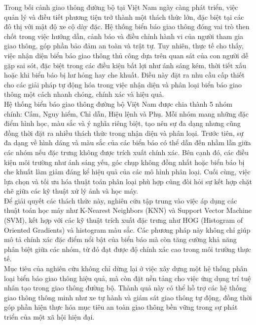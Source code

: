 \documentclass[a4paper,12pt]{article}
\begin{document}
Trong bối cảnh giao thông đường bộ tại Việt Nam ngày càng phát triển, việc quản lý và điều tiết phương tiện trở thành một thách thức lớn, đặc biệt tại các đô thị với mật độ xe cộ dày đặc. Hệ thống biển báo giao thông đóng vai trò then chốt trong việc hướng dẫn, cảnh báo và điều chỉnh hành vi của người tham gia giao thông, góp phần bảo đảm an toàn và trật tự. Tuy nhiên, thực tế cho thấy, việc nhận diện biển báo giao thông thủ công dựa trên quan sát của con người dễ gặp sai sót, đặc biệt trong các điều kiện bất lợi như ánh sáng kém, thời tiết xấu hoặc khi biển báo bị hư hỏng hay che khuất. Điều này đặt ra nhu cầu cấp thiết cho các giải pháp tự động hóa trong việc nhận diện và phân loại biển báo giao thông một cách nhanh chóng, chính xác và hiệu quả.\\[0.1cm]

Hệ thống biển báo giao thông đường bộ Việt Nam được chia thành 5 nhóm chính: Cấm, Nguy hiểm, Chỉ dẫn, Hiệu lệnh và Phụ. Mỗi nhóm mang những đặc điểm hình học, màu sắc và ý nghĩa riêng biệt, tạo nên sự đa dạng nhưng cũng đồng thời đặt ra nhiều thách thức trong nhận diện và phân loại. Trước tiên, sự đa dạng về hình dáng và màu sắc của các biển báo có thể dẫn đến nhầm lẫn giữa các nhóm nếu đặc trưng không được trích xuất chính xác. Bên cạnh đó, các điều kiện môi trường như ánh sáng yếu, góc chụp không đồng nhất hoặc biển báo bị che khuất làm giảm đáng kể hiệu quả của các mô hình phân loại. Cuối cùng, việc lựa chọn và tối ưu hóa thuật toán phân loại phù hợp cũng đòi hỏi sự kết hợp chặt chẽ giữa các kỹ thuật xử lý ảnh và học máy.\\[0.1cm]

Để giải quyết các thách thức này, nghiên cứu tập trung vào việc áp dụng các thuật toán học máy như K-Nearest Neighbors (KNN) và Support Vector Machine (SVM), kết hợp với các kỹ thuật trích xuất đặc trưng như HOG (Histogram of Oriented Gradients) và histogram màu sắc. Các phương pháp này không chỉ giúp mô tả chính xác đặc điểm nổi bật của biển báo mà còn tăng cường khả năng phân biệt giữa các nhóm, từ đó đạt được độ chính xác cao trong môi trường thực tế.\\[0.1cm]

Mục tiêu của nghiên cứu không chỉ dừng lại ở việc xây dựng một hệ thống phân loại biển báo giao thông hiệu quả, mà còn đặt nền tảng cho việc ứng dụng trí tuệ nhân tạo trong giao thông đường bộ. Thành quả này có thể hỗ trợ các hệ thống giao thông thông minh như xe tự hành và giám sát giao thông tự động, đồng thời góp phần hiện thực hóa mục tiêu an toàn giao thông bền vững trong sự phát triển của một xã hội hiện đại.
\end{document}
